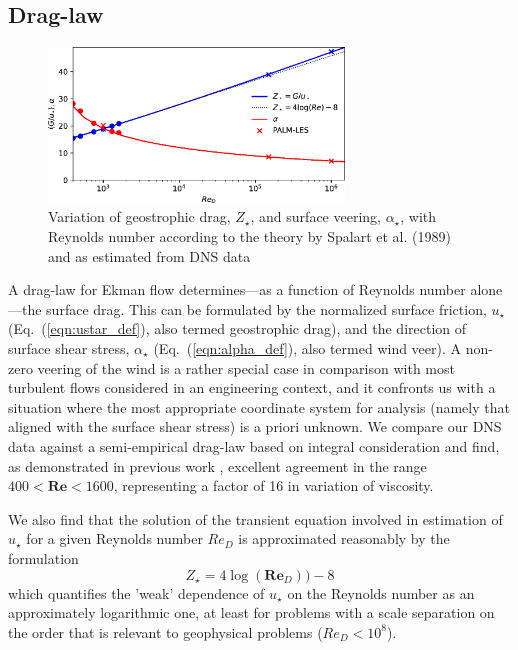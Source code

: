 \documentclass[smallcondensed,final]{svjour3}
\begin{document}
\subsection{Drag-law}
\label{sec:drag-law}
\begin{figure}
  \centerline{\includegraphics[width=0.7\textwidth]{Fig4.eps}} %
  \caption{Variation of geostrophic drag, $Z_\star$, and surface veering, $\alpha_\star$, with Reynolds number according to
    the theory by Spalart et al. (1989) and as estimated from DNS data
    \label{fig:drag_law}}
\end{figure}
A drag-law for Ekman flow determines---as a function of Reynolds number alone---the surface drag.
%
This can be formulated by the normalized surface friction, $u_\star$ (Eq.~(\ref{eqn:ustar_def}), also termed geostrophic drag), 
and the direction of surface shear stress, $\alpha_\star$ (Eq.~(\ref{eqn:alpha_def}), also termed wind veer). 
%
A non-zero veering of the wind is a rather special case in comparison with most turbulent flows considered in an
engineering context, and it confronts us with a situation where the most appropriate coordinate system
for analysis (namely that aligned with the surface shear stress) is a priori unknown. 
%
We compare our DNS data against a semi-empirical drag-law based on integral consideration \citep{spalart:JFM1989}
and find, as demonstrated in previous work \citep{ansorge:BM2014}, excellent agreement in the range
 $400<\mathbf{Re}<1600$, representing a factor of 16 in variation of viscosity. 
%
\par
%
We also find that the solution of the transient equation involved in estimation of $u_\star$ for a given Reynolds number
$Re_D$ is approximated reasonably by the formulation
\begin{equation}
  Z_\star= 4\log(\mathbf{Re}_D))-8
  \label{eqn:zstar}
\end{equation}
which quantifies the 'weak' dependence of $u_\star$ on the Reynolds number as an approximately logarithmic one, at least
for problems with a scale separation on the order that is relevant to geophysical problems ($Re_D<10^{8}$).  
%
%
\end{document}
